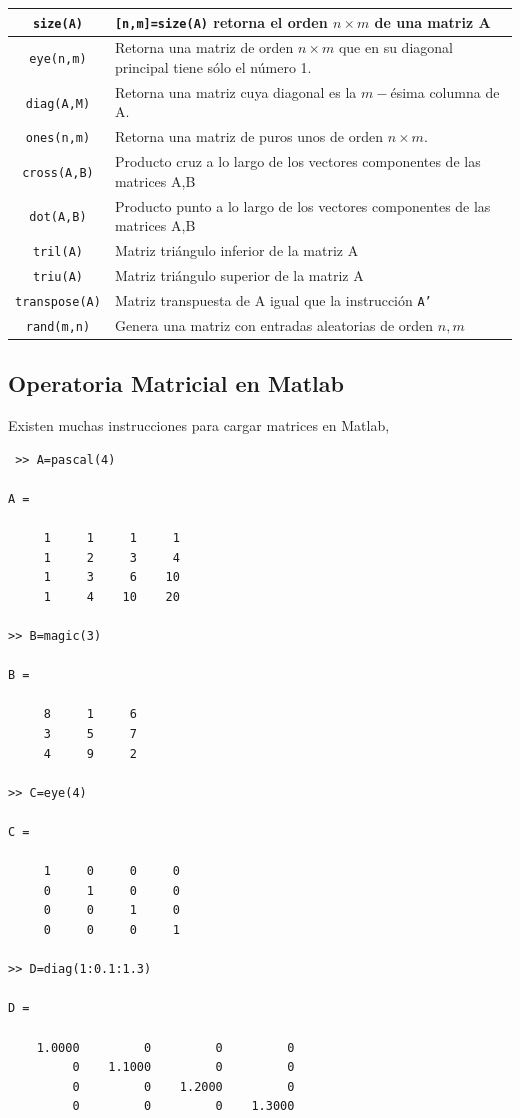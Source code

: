 \documentclass[12pt,letterpaper]{article}
\begin{document}
\begin{longtable}{||c|p{}||}
\hline
\texttt{size(A)}	&	\texttt{[n,m]=size(A)} retorna el orden $n\times m$  de una matriz A\\
\hline
\texttt{eye(n,m)} 	& 	Retorna una matriz de orden $n\times m$ que en su diagonal principal tiene s\'olo el n\'umero 1. \\
\hline
\texttt{diag(A,M)}	&	Retorna una matriz cuya diagonal es la $m-$\'esima columna de A.\\
\hline
\texttt{ones(n,m)}	&  	Retorna una matriz de puros unos de orden $n\times m$. \\
\hline
\texttt{cross(A,B)} & 	Producto cruz a lo largo de los vectores componentes de las matrices A,B \\
\hline
\texttt{dot(A,B)}	&	Producto punto a lo largo de los vectores componentes de las matrices A,B \\
\hline
\texttt{tril(A)}	& 	Matriz tri\'angulo inferior de la matriz A\\
\hline
\texttt{triu(A)}	& 	Matriz tri\'angulo superior de la matriz A\\
\hline
\texttt{transpose(A)} & Matriz transpuesta de A igual que la instrucci\'on \texttt{A'}\\
\hline
\texttt{rand(m,n)}	&	Genera una matriz con entradas aleatorias de orden $n,m$\\
\hline
\end{longtable}

\subsection{Operatoria Matricial en Matlab}
Existen muchas instrucciones para cargar matrices en Matlab,
\begin{multicols}{2}
\begin{verbatim}
 >> A=pascal(4)

A =

     1     1     1     1
     1     2     3     4
     1     3     6    10
     1     4    10    20 
     
>> B=magic(3)

B =

     8     1     6
     3     5     7
     4     9     2
     
>> C=eye(4)

C =

     1     0     0     0
     0     1     0     0
     0     0     1     0
     0     0     0     1
     
>> D=diag(1:0.1:1.3)

D =

    1.0000         0         0         0
         0    1.1000         0         0
         0         0    1.2000         0
         0         0         0    1.3000
     
     \end{verbatim}
\end{multicols}
\end{document}
